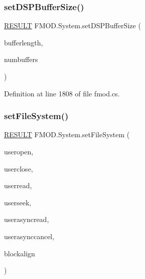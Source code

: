 \subsubsection{\texorpdfstring{set\+D\+S\+P\+Buffer\+Size()}{setDSPBufferSize()}}
{\footnotesize\ttfamily \hyperlink{namespace_f_m_o_d_a305d1176ef3f8c8815861a60407ac33d}{R\+E\+S\+U\+LT} F\+M\+O\+D.\+System.\+set\+D\+S\+P\+Buffer\+Size (\begin{DoxyParamCaption}\item[{uint}]{bufferlength,  }\item[{int}]{numbuffers }\end{DoxyParamCaption})}



Definition at line 1808 of file fmod.\+cs.

\mbox{\label{class_f_m_o_d_1_1_system_a766feb3efc89241373feea0bfe84b39e}} 
\subsubsection{\texorpdfstring{set\+File\+System()}{setFileSystem()}}
{\footnotesize\ttfamily \hyperlink{namespace_f_m_o_d_a305d1176ef3f8c8815861a60407ac33d}{R\+E\+S\+U\+LT} F\+M\+O\+D.\+System.\+set\+File\+System (\begin{DoxyParamCaption}\item[{\hyperlink{namespace_f_m_o_d_a6aacb40c0bfa3448934de11beb9ed447}{F\+I\+L\+E\+\_\+\+O\+P\+E\+N\+C\+A\+L\+L\+B\+A\+CK}}]{useropen,  }\item[{\hyperlink{namespace_f_m_o_d_ae4fc590f93bf7202703858219d3b2fbd}{F\+I\+L\+E\+\_\+\+C\+L\+O\+S\+E\+C\+A\+L\+L\+B\+A\+CK}}]{userclose,  }\item[{\hyperlink{namespace_f_m_o_d_a074a94c39aa2d2569a57ed255f6c9011}{F\+I\+L\+E\+\_\+\+R\+E\+A\+D\+C\+A\+L\+L\+B\+A\+CK}}]{userread,  }\item[{\hyperlink{namespace_f_m_o_d_a5fb329aae3aea0658fa46c593359ead3}{F\+I\+L\+E\+\_\+\+S\+E\+E\+K\+C\+A\+L\+L\+B\+A\+CK}}]{userseek,  }\item[{\hyperlink{namespace_f_m_o_d_a12de5190001a0edf457fa49c0a2bde10}{F\+I\+L\+E\+\_\+\+A\+S\+Y\+N\+C\+R\+E\+A\+D\+C\+A\+L\+L\+B\+A\+CK}}]{userasyncread,  }\item[{\hyperlink{namespace_f_m_o_d_a3122c90ec3ea0bfc0ec3b7372267b5f1}{F\+I\+L\+E\+\_\+\+A\+S\+Y\+N\+C\+C\+A\+N\+C\+E\+L\+C\+A\+L\+L\+B\+A\+CK}}]{userasynccancel,  }\item[{int}]{blockalign }\end{DoxyParamCaption})}



